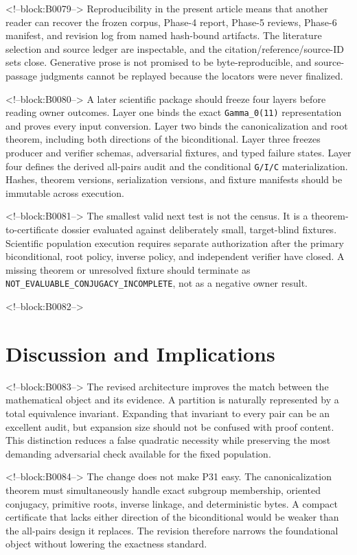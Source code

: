 \documentclass[11pt]{article}
\begin{document}
<!--block:B0079-->
Reproducibility in the present article means that another reader can
recover the frozen corpus, Phase-4 report, Phase-5 reviews, Phase-6
manifest, and revision log from named hash-bound artifacts. The
literature selection and source ledger are inspectable, and the
citation/reference/source-ID sets close. Generative prose is not
promised to be byte-reproducible, and source-passage judgments cannot be
replayed because the locators were never finalized.

<!--block:B0080-->
A later scientific package should freeze four layers before reading
owner outcomes. Layer one binds the exact \texttt{Gamma\_0(11)}
representation and proves every input conversion. Layer two binds the
canonicalization and root theorem, including both directions of the
biconditional. Layer three freezes producer and verifier schemas,
adversarial fixtures, and typed failure states. Layer four defines the
derived all-pairs audit and the conditional \texttt{G/I/C}
materialization. Hashes, theorem versions, serialization versions, and
fixture manifests should be immutable across execution.

<!--block:B0081-->
The smallest valid next test is not the census. It is a
theorem-to-certificate dossier evaluated against deliberately small,
target-blind fixtures. Scientific population execution requires separate
authorization after the primary biconditional, root policy, inverse
policy, and independent verifier have closed. A missing theorem or
unresolved fixture should terminate as
\texttt{NOT\_EVALUABLE\_CONJUGACY\_INCOMPLETE}, not as a negative owner
result.

<!--block:B0082-->
\hypertarget{7-discussion-and-implications}{%
\section{Discussion and
Implications}\label{7-discussion-and-implications}}

<!--block:B0083-->
The revised architecture improves the match between the mathematical
object and its evidence. A partition is naturally represented by a total
equivalence invariant. Expanding that invariant to every pair can be an
excellent audit, but expansion size should not be confused with proof
content. This distinction reduces a false quadratic necessity while
preserving the most demanding adversarial check available for the fixed
population.

<!--block:B0084-->
The change does not make P31 easy. The canonicalization theorem must
simultaneously handle exact subgroup membership, oriented conjugacy,
primitive roots, inverse linkage, and deterministic bytes. A compact
certificate that lacks either direction of the biconditional would be
weaker than the all-pairs design it replaces. The revision therefore
narrows the foundational object without lowering the exactness standard.
\end{document}
